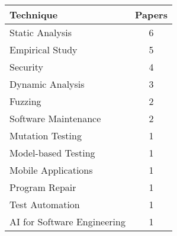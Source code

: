 \begin{tabular}{lc}
\toprule
 Technique                   &  Papers  \\
\midrule
 Static Analysis             &    6     \\
 Empirical Study             &    5     \\
 Security                    &    4     \\
 Dynamic Analysis            &    3     \\
 Fuzzing                     &    2     \\
 Software Maintenance        &    2     \\
 Mutation Testing            &    1     \\
 Model-based Testing         &    1     \\
 Mobile Applications         &    1     \\
 Program Repair              &    1     \\
 Test Automation             &    1     \\
 AI for Software Engineering &    1     \\
\bottomrule
\end{tabular}
